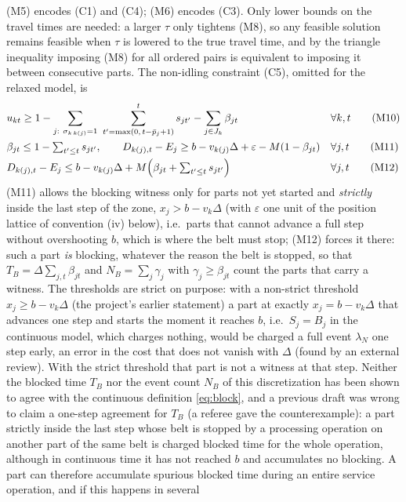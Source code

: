 \documentclass[11pt,a4paper]{article}
\theoremstyle{plain}
\theoremstyle{definition}
\theoremstyle{remark}
\begin{document}
(M5) encodes (C1) and (C4); (M6) encodes (C3). Only lower bounds on the travel times are
needed: a larger $\tau$ only tightens (M8), so any feasible solution remains feasible when
$\tau$ is lowered to the true travel time, and by the triangle inequality imposing (M8)
for all ordered pairs is equivalent to imposing it between consecutive parts. The
non-idling constraint (C5), omitted for the relaxed model, is
\begin{align}
&u_{kt}\ge 1-\sum_{j:\ \sigma_{k\,k(j)}=1}\ \sum_{t'=\max(0,\,t-\bar p_j+1)}^{t}s_{jt'}-\sum_{j\in J_k}\beta_{jt} && \forall k,t \tag{M10}\\
&\beta_{jt}\le 1-\textstyle\sum_{t'\le t}s_{jt'},\qquad
 D_{k(j),t}-E_j\ge b-v_{k(j)}\Delta+\varepsilon-M(1-\beta_{jt}) && \forall j,t \tag{M11}\\
&D_{k(j),t}-E_j\le b-v_{k(j)}\Delta+M\Bigl(\beta_{jt}+\textstyle\sum_{t'\le t}s_{jt'}\Bigr) && \forall j,t \tag{M12}
\end{align}
(M11) allows the blocking witness only for parts not yet started and \emph{strictly}
inside the last step of the zone, $x_j>b-v_k\Delta$ (with $\varepsilon$ one unit of the
position lattice of convention (iv) below), i.e.\ parts that cannot advance a full step without
overshooting $b$, which is where the belt must stop; (M12) forces it there: such a part
\emph{is} blocking, whatever the reason the belt is stopped, so that
$T_B=\Delta\sum_{j,t}\beta_{jt}$ and $N_B=\sum_j\gamma_j$ with $\gamma_j\ge\beta_{jt}$
count the parts that carry a witness. The
thresholds are strict on purpose: with a non-strict threshold $x_j\ge b-v_k\Delta$ (the
project's earlier statement) a part at exactly $x_j=b-v_k\Delta$ that advances one step
and starts the moment it reaches $b$, i.e.\ $S_j=B_j$ in the continuous model, which
charges nothing, would be charged a full event $\lambda_N$ one step early, an error in
the cost that does not vanish with $\Delta$ (found by an external review). With the
strict threshold that part is not a witness at that step. Neither the blocked time $T_B$
nor the event count $N_B$ of this discretization has been shown to agree with the
continuous definition \eqref{eq:block}, and a previous draft was wrong to claim a
one-step agreement for $T_B$ (a referee gave the counterexample): a part strictly inside
the last step whose belt is stopped by a processing operation on another part of the
same belt is charged blocked time for the whole operation, although in continuous time
it has not reached $b$ and accumulates no blocking. A part can therefore accumulate
spurious blocked time during an entire service operation, and if this happens in several
\end{document}
